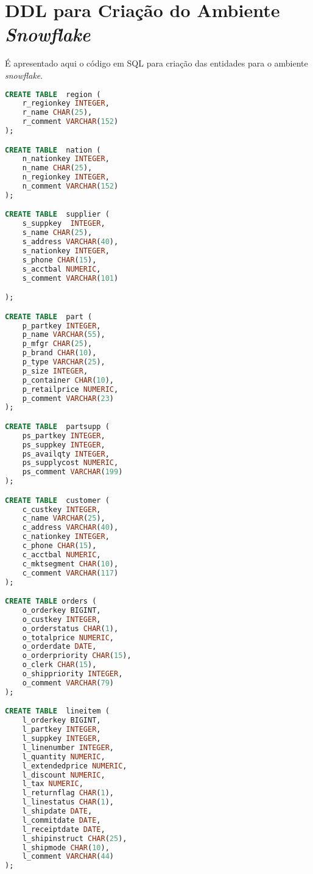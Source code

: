 
\chapter{DDL para Criação do Ambiente \textit{Snowflake}}
\label{ddl_snow}

É apresentado aqui o código em SQL para criação das entidades para o ambiente \textit{snowflake}. 

\begin{lstlisting}[language=SQL]
CREATE TABLE  region (
	r_regionkey INTEGER,
	r_name CHAR(25),
	r_comment VARCHAR(152)
);

CREATE TABLE  nation (
	n_nationkey INTEGER,
	n_name CHAR(25),
	n_regionkey INTEGER,
	n_comment VARCHAR(152)
);

CREATE TABLE  supplier (
	s_suppkey  INTEGER,
	s_name CHAR(25),
	s_address VARCHAR(40),
	s_nationkey INTEGER,
	s_phone CHAR(15),
	s_acctbal NUMERIC,
	s_comment VARCHAR(101)

);

CREATE TABLE  part (
	p_partkey INTEGER,
	p_name VARCHAR(55),
	p_mfgr CHAR(25),
	p_brand CHAR(10),
	p_type VARCHAR(25),
	p_size INTEGER,
	p_container CHAR(10),
	p_retailprice NUMERIC,
	p_comment VARCHAR(23)
);

CREATE TABLE  partsupp (
	ps_partkey INTEGER,
	ps_suppkey INTEGER,
	ps_availqty INTEGER,
	ps_supplycost NUMERIC,
	ps_comment VARCHAR(199)
);

CREATE TABLE  customer (
	c_custkey INTEGER,
	c_name VARCHAR(25),
	c_address VARCHAR(40),
	c_nationkey INTEGER,
	c_phone CHAR(15),
	c_acctbal NUMERIC,
	c_mktsegment CHAR(10),
	c_comment VARCHAR(117)   
);

CREATE TABLE orders (
	o_orderkey BIGINT,
	o_custkey INTEGER,
	o_orderstatus CHAR(1),
	o_totalprice NUMERIC,
	o_orderdate DATE,
	o_orderpriority CHAR(15),
	o_clerk CHAR(15),
	o_shippriority INTEGER,
	o_comment VARCHAR(79)
);

CREATE TABLE  lineitem (
	l_orderkey BIGINT,
	l_partkey INTEGER,
	l_suppkey INTEGER,
	l_linenumber INTEGER,
	l_quantity NUMERIC,
	l_extendedprice NUMERIC,
	l_discount NUMERIC,
	l_tax NUMERIC,
	l_returnflag CHAR(1),
	l_linestatus CHAR(1),
	l_shipdate DATE,
	l_commitdate DATE,
	l_receiptdate DATE,
	l_shipinstruct CHAR(25),
	l_shipmode CHAR(10),
	l_comment VARCHAR(44)
);
		
\end{lstlisting}


	
